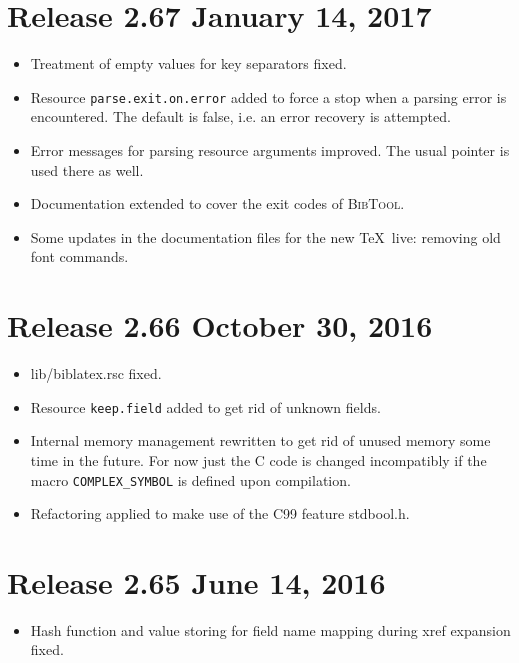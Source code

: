 \documentclass[11pt,a4paper]{scrartcl}
\newcommand\rsc[1]{\texttt{#1}}
\newcommand\File[1]{\textsf{#1}}
\newcommand\BibTool{\textsc{BibTool}}
\newenvironment{Release}[2]{%
  \def\tmp{#2}%
  \section*{Release #1 \ifx\tmp\empty\else{\normalsize[#2]}\fi}
  \begin{itemize}
}{\end{itemize}}
\newenvironment{Fix}[1]{\item }{}
\newenvironment{New}[1]{\item }{}
\newenvironment{Update}[1]{\item }{}
\begin{document}
\begin{multicols}
 \begin{Release}{2.67}{January 14, 2017}
  \begin{Fix}{gene}
    Treatment of empty values for key separators fixed.
  \end{Fix}
  \begin{New}{gene}
    Resource \rsc{parse.exit.on.error} added to force a stop when a parsing
    error is encountered. The default is false, i.e. an error recovery is
    attempted.
  \end{New}
  \begin{Update}{gene}
    Error messages for parsing resource arguments improved. The usual pointer
    is used there as well.
  \end{Update}
  \begin{Update}{gene}
    Documentation extended to cover the exit codes of \BibTool.
  \end{Update}
  \begin{Update}{gene}
    Some updates in the documentation files for the new \TeX\ live:
    removing old font commands.
  \end{Update}
 \end{Release}

 \begin{Release}{2.66}{October 30, 2016}
  \begin{Fix}{gene}
    \File{lib/biblatex.rsc} fixed.
  \end{Fix}
  \begin{New}{gene}
    Resource \rsc{keep.field} added to get rid of unknown fields.
  \end{New}
  \begin{Update}{gene}
    Internal memory management rewritten to get rid of unused memory
    some time in the future. For now just the C code is changed
    incompatibly if the macro \verb|COMPLEX_SYMBOL| is defined upon
    compilation.
  \end{Update}
  \begin{Update}{gene}
    Refactoring applied to make use of the C99 feature
    \File{stdbool.h}.
  \end{Update}
 \end{Release}

 \begin{Release}{2.65}{June 14, 2016}
  \begin{Fix}{gene}
    Hash function and value storing for field name mapping during xref
    expansion fixed.
  \end{Fix}
 \end{Release}


\end{multicols}
\end{document}
